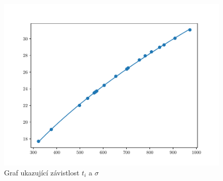 \documentclass{article}
\begin{document}
\begin{figure}[hbt!]
  \begin{center}
    \includegraphics[scale=0.7]{lin.pdf}
    \end{center}
  \caption{Graf ukazující závistlost $t_{i}$ a $\sigma$}
\end{figure}
\newpage
\end{document}
